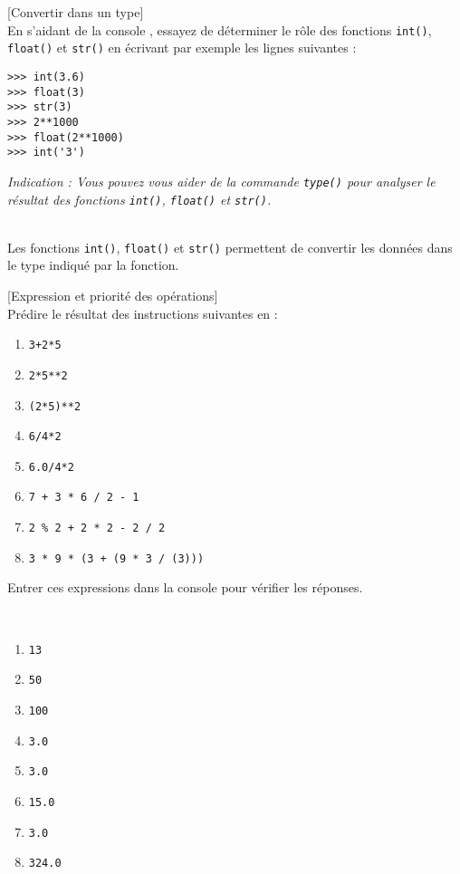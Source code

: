 \documentclass[a4paper,12pt]{article}
\begin{document}
\exo{}[Convertir dans un type]  ~\\ 
 En s'aidant de la console \py, essayez de déterminer le rôle des fonctions \lstinline{int()},
\lstinline{float()} et \lstinline{str()} en écrivant par exemple les lignes suivantes :
\begin{lstlisting}[numbers=none]
>>> int(3.6)
>>> float(3)
>>> str(3)
>>> 2**1000
>>> float(2**1000)
>>> int('3')
\end{lstlisting}
\vspace{0.3cm}
\textit{Indication : Vous pouvez vous aider de la commande \lstinline{type()} pour analyser le résultat des fonctions \lstinline{int()}, \lstinline{float()} et \lstinline{str()}.}
	\begin{correction}
	~\\ 
	Les fonctions \lstinline{int()}, \lstinline{float()} et \lstinline{str()} permettent de convertir les données dans le type indiqué par la fonction.
\end{correction}
\finexo
\newpage
\exo{}[Expression et priorité des opérations]  ~\\ 
Prédire le résultat des instructions suivantes en \py:
\begin{multicols}{2}
	\begin{enumerate}[label=\alph*)]
		\item \lstinline{3+2*5}
		\item \lstinline{2*5**2}
		\item \lstinline{(2*5)**2}
		\item \lstinline{6/4*2}
		\item \lstinline{6.0/4*2}
		\item \lstinline{7 + 3 * 6 / 2 - 1}
		\item \lstinline{2 % 2 + 2 * 2 - 2 / 2}
		\item \lstinline{3 * 9 * (3 + (9 * 3 / (3)))}
	\end{enumerate}
\end{multicols}
	Entrer ces expressions dans la console \py pour vérifier les réponses.
	
    \begin{correction}
	~\\ 
\begin{multicols}{2}
	\begin{enumerate}[label=\alph*)]
		\item \lstinline{13}
		\item \lstinline{50}
		\item \lstinline{100}
		\item \lstinline{3.0}
		\item \lstinline{3.0}
		\item \lstinline{15.0}
		\item \lstinline{3.0}
		\item \lstinline{324.0}
		\end{enumerate}
	\end{multicols}
\end{correction}
\finexo
\end{document}
